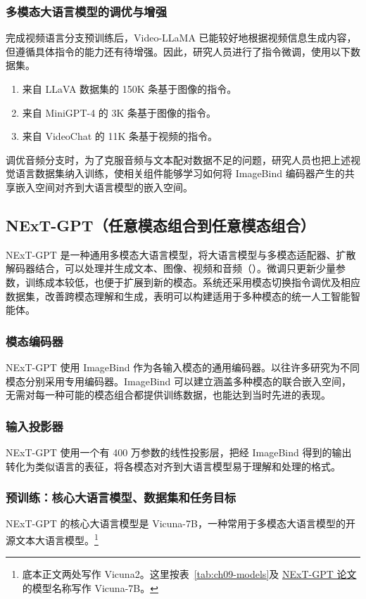 \subsubsection{多模态大语言模型的调优与增强}
完成视频语言分支预训练后，Video-LLaMA 已能较好地根据视频信息生成内容，但遵循具体指令的能力还有待增强。因此，研究人员进行了指令微调，使用以下数据集。
\begin{enumerate}
\item 来自 LLaVA 数据集的 150K 条基于图像的指令。
\item 来自 MiniGPT-4 的 3K 条基于图像的指令。
\item 来自 VideoChat 的 11K 条基于视频的指令。
\end{enumerate}
调优音频分支时，为了克服音频与文本配对数据不足的问题，研究人员也把上述视觉语言数据集纳入训练，使相关组件能够学习如何将 ImageBind 编码器产生的共享嵌入空间对齐到大语言模型的嵌入空间。

\subsection{NExT-GPT（任意模态组合到任意模态组合）}
\label{sec:ch09-next-gpt}
NExT-GPT 是一种通用多模态大语言模型，将大语言模型与多模态适配器、扩散解码器结合，可以处理并生成文本、图像、视频和音频（）。微调只更新少量参数，训练成本较低，也便于扩展到新的模态。系统还采用模态切换指令调优及相应数据集，改善跨模态理解和生成，表明可以构建适用于多种模态的统一人工智能智能体。

\subsubsection{模态编码器}
NExT-GPT 使用 ImageBind 作为各输入模态的通用编码器。以往许多研究为不同模态分别采用专用编码器。ImageBind 可以建立涵盖多种模态的联合嵌入空间，无需对每一种可能的模态组合都提供训练数据，也能达到当时先进的表现。

\subsubsection{输入投影器}
NExT-GPT 使用一个有 400 万参数的线性投影层，把经 ImageBind 得到的输出转化为类似语言的表征，将各模态对齐到大语言模型易于理解和处理的格式。

\subsubsection{预训练：核心大语言模型、数据集和任务目标}
NExT-GPT 的核心大语言模型是 Vicuna-7B，一种常用于多模态大语言模型的开源文本大语言模型。\footnote{底本正文两处写作 Vicuna2。这里按表~\ref{tab:ch09-models}及 \href{https://arxiv.org/abs/2309.05519}{NExT-GPT 论文}的模型名称写作 Vicuna-7B。}

